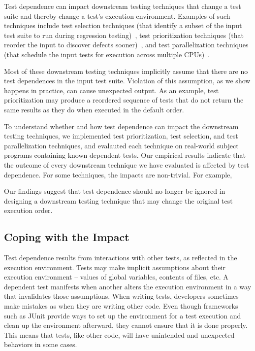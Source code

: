 Test dependence can impact downstream testing
techniques that change a test suite and thereby change a test's
execution environment. Examples of such techniques include
test selection techniques (that identify a subset of the input
test suite to run during regression testing)~\cite{harroldetal:OOPSLA:2001, Orso:2004:SRT,
Briand:2009:ART, Zhang:2012:RMT, Nanda:2011:RTP, hsu09may},
test prioritization techniques (that reorder the input to
discover defects sooner)~\cite{Elbaum:2000:PTC:347324.348910,
Kim:2002:HTP:581339.581357, Rummel:2005:TPR:1066677.1067016, Srivastava:2002:EPT:566172.566187, Jiang:2009:ART},
and test parallelization
techniques (that schedule the input tests for execution across
multiple CPUs)~\cite{Misailovic:2007, Kim:2013:OUT}.

Most of these downstream testing techniques implicitly
assume that there are no test dependences in the input test
suite. Violation of this assumption, as we show happens in
practice, can cause unexpected output. As an example, test
prioritization may produce a reordered sequence of tests that
do not return the same results as they do when executed in
the default order.

To understand whether and how test dependence can impact
the downstream testing techniques, we implemented \prionum
test prioritization, \selnum test selection, and \parnum test parallelization
techniques, and evalauted each technique
on \subjnum real-world subject programs containing known dependent tests.
Our empirical results indicate that the outcome of
every downstream technique we have evaluated is affected by 
test dependence. For some
techniques, the impacts are non-trivial. For example,

Our findings suggest that test dependence should no longer
be ignored in designing a downstream testing technique that
may change the original test execution order.



\subsection{Coping with the Impact}


Test dependence results from interactions with other tests,
as reflected in the execution environment. Tests may make
implicit assumptions about their execution environment --
values of global variables, contents of files, etc. A dependent
test manifests when another alters the execution environment
in a way that invalidates those assumptions.
When writing tests, developers sometimes
make mistakes as when they are writing
other code. Even though frameworks such as JUnit provide
ways to set up the environment for a test execution and clean
up the environment afterward, they cannot ensure that it is
done properly. This means that tests, like other code, will
have unintended and unexpected behaviors in some cases.

